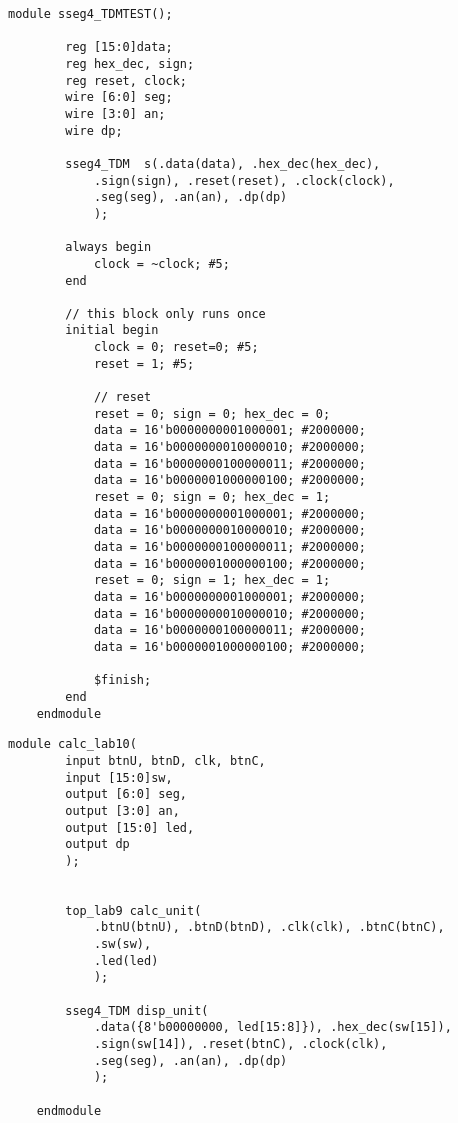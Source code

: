 \documentclass[11pt]{article}
\begin{document}
\begin{lstlisting}[style=Verilog,
caption=Sseg4TDM Test,
label=MUX4 Test
]
	module sseg4_TDMTEST();
	
		reg [15:0]data;
		reg hex_dec, sign;
		reg reset, clock;
		wire [6:0] seg;
		wire [3:0] an;
		wire dp;
		
		sseg4_TDM  s(.data(data), .hex_dec(hex_dec),
			.sign(sign), .reset(reset), .clock(clock),
			.seg(seg), .an(an), .dp(dp)
			);
		
		always begin 
			clock = ~clock; #5; 
		end
		
		// this block only runs once
		initial begin
			clock = 0; reset=0; #5;
			reset = 1; #5;
		
			// reset
			reset = 0; sign = 0; hex_dec = 0; 
			data = 16'b0000000001000001; #2000000;
			data = 16'b0000000010000010; #2000000;
			data = 16'b0000000100000011; #2000000;
			data = 16'b0000001000000100; #2000000;
			reset = 0; sign = 0; hex_dec = 1; 
			data = 16'b0000000001000001; #2000000;
			data = 16'b0000000010000010; #2000000;
			data = 16'b0000000100000011; #2000000;
			data = 16'b0000001000000100; #2000000;
			reset = 0; sign = 1; hex_dec = 1; 
			data = 16'b0000000001000001; #2000000;
			data = 16'b0000000010000010; #2000000;
			data = 16'b0000000100000011; #2000000;
			data = 16'b0000001000000100; #2000000;
			
			$finish;
		end 
	endmodule
\end{lstlisting}
\clearpage
\begin{lstlisting}[style=Verilog,
caption=CalcLab10,
label=MUX2 Test
]
	module calc_lab10(
		input btnU, btnD, clk, btnC,
		input [15:0]sw,
		output [6:0] seg,
		output [3:0] an,
		output [15:0] led,
		output dp
		);
	
	
		top_lab9 calc_unit(
			.btnU(btnU), .btnD(btnD), .clk(clk), .btnC(btnC),
			.sw(sw),
			.led(led)
			);
		
		sseg4_TDM disp_unit(
			.data({8'b00000000, led[15:8]}), .hex_dec(sw[15]),
			.sign(sw[14]), .reset(btnC), .clock(clk),
			.seg(seg), .an(an), .dp(dp)
			);
	
	endmodule
\end{lstlisting}
\end{document}
